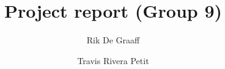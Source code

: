 \title{Project report (Group 9)} %
\author{Rik De Graaff \and Travis Rivera Petit} %

\institute{\lectureInstitute} %
\begin{report}











\end{report}
